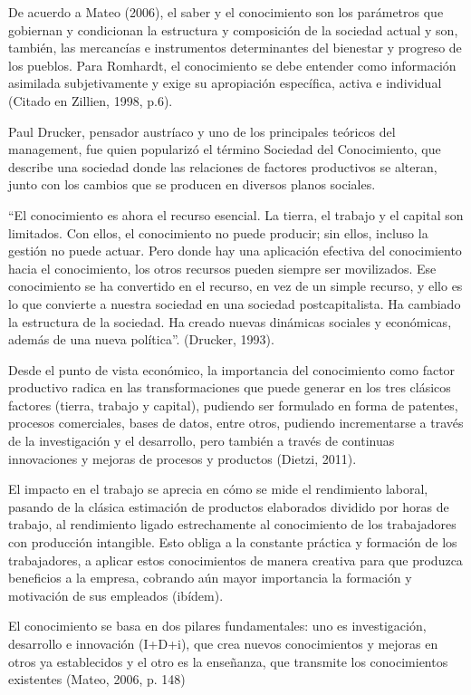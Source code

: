 \documentclass{article}
\begin{document}
De acuerdo a Mateo (2006), el saber y el conocimiento son los parámetros que gobiernan y condicionan la estructura y composición de la sociedad actual y son, también, las mercancías e instrumentos determinantes del bienestar y progreso de los pueblos. Para Romhardt, el conocimiento se debe entender como información asimilada subjetivamente y exige su apropiación específica, activa e individual (Citado en Zillien, 1998, p.6). 

Paul Drucker, pensador austríaco y uno de los principales teóricos del management, fue quien popularizó el término Sociedad del Conocimiento, que describe una sociedad donde las relaciones de factores productivos se alteran, junto con los cambios que se producen en diversos planos sociales.

“El conocimiento es ahora el recurso esencial. La tierra, el trabajo y el capital son limitados. Con ellos, el conocimiento no puede producir; sin ellos, incluso la gestión no puede actuar. Pero donde hay una aplicación efectiva del conocimiento hacia el conocimiento, los otros recursos pueden siempre ser movilizados. Ese conocimiento se ha convertido en el recurso, en vez de un simple recurso, y ello es lo que convierte a nuestra sociedad en una sociedad postcapitalista. Ha cambiado la estructura de la sociedad. Ha creado nuevas dinámicas sociales y económicas, además de una nueva política”. (Drucker, 1993).

Desde el punto de vista económico, la importancia del conocimiento como factor productivo radica en las transformaciones que puede generar en los tres clásicos factores (tierra, trabajo y capital), pudiendo ser formulado en forma de patentes, procesos comerciales, bases de datos, entre otros, pudiendo incrementarse a través de la investigación y el desarrollo, pero también a través de continuas innovaciones y mejoras de procesos y productos (Dietzi, 2011).

El impacto en el trabajo se aprecia en cómo se mide el rendimiento laboral, pasando de la clásica estimación de productos elaborados dividido por horas de trabajo, al rendimiento ligado estrechamente al conocimiento de los trabajadores con producción intangible. Esto obliga a la constante práctica y formación de los trabajadores, a aplicar estos conocimientos de manera creativa para que produzca beneficios a la empresa, cobrando aún mayor importancia la formación y motivación de sus empleados (ibídem).

El conocimiento se basa en dos pilares fundamentales: uno es investigación, desarrollo e innovación (I+D+i), que crea nuevos conocimientos y mejoras en otros ya establecidos y el otro es la enseñanza, que transmite los conocimientos existentes (Mateo, 2006, p. 148)
\end{document}
